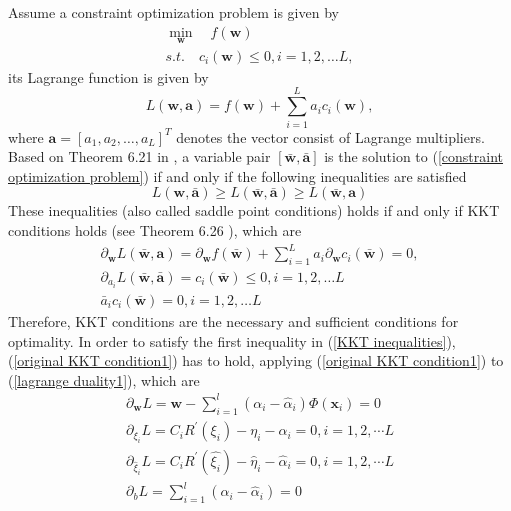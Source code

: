 Assume a constraint optimization problem is given by 
\begin{eqnarray}
\nonumber
\min_{\mathbf{w}} \quad f(\mathbf{w})\\
s.t. \quad c_{i}(\mathbf{w})\leq 0, i=1,2,\ldots L,
\label{constraint optimization problem}
\end{eqnarray}
its Lagrange function is given by 
\begin{equation}
L(\mathbf{w}, \mathbf{a})=f(\mathbf{w})+\sum_{i=1}^{L}a_{i}c_{i}(\mathbf{w}),
\label{orginal Lagrange}
\end{equation}
where $\mathbf{a}=[a_{1},a_{2},\ldots, a_{L}]^{T}$ denotes the vector consist of Lagrange multipliers.
 Based on Theorem 6.21 in \cite{scholkopf2002learning}, a variable pair $[\bar{\mathbf{w}}, \bar{\mathbf{a}}]$ is the solution to (\ref{constraint optimization problem}) if and only if the following inequalities are satisfied
 \begin{equation}
 L(\mathbf{w}, \bar{\mathbf{a}})\geq L(\bar{\mathbf{w}}, \bar{\mathbf{a}})\geq L(\bar{\mathbf{w}}, \mathbf{a})
 \label{KKT inequalities}
 \end{equation}
These inequalities (also called saddle point conditions) holds if and only if KKT conditions holds (see Theorem 6.26 \cite{scholkopf2002learning}), which are 
\begin{eqnarray}
\label{original KKT condition1}
\partial_{\mathbf{w}}L(\bar{\mathbf{w}}, \mathbf{a})=\partial_{\mathbf{w}}f(\bar{\mathbf{w}})+\sum_{i=1}^{L}a_{i}\partial_{\mathbf{w}}c_{i}(\bar{\mathbf{w}})=0,\\
\label{original KKT condition2}
\partial_{a_{i}}L(\bar{\mathbf{w}}, \bar{\mathbf{a}})=c_{i}(\bar{\mathbf{w}})\leq 0, i=1,2,\ldots L\\
\label{original KKT condition3}
\bar{a}_{i}c_{i}(\bar{\mathbf{w}})=0, i=1,2,\ldots L
\end{eqnarray}
Therefore, KKT conditions are the necessary and sufficient conditions for optimality.
In order to satisfy the first inequality in (\ref{KKT inequalities}), (\ref{original KKT condition1}) has to hold,
applying (\ref{original KKT condition1}) to (\ref{lagrange duality1}), which are  
\begin{eqnarray}
\label{partial1}
\partial_{\mathbf{w}} L=\mathbf{w}-\sum_{i=1}^{l}(\alpha_{i}-\hat{\alpha}_{i})\Phi(\mathbf{x}_{i})=0\\
\label{partial2}
\partial_{\xi_{i}}L=C_{i}R^{'}(\xi_{i})-\eta_{i}-\alpha_{i}=0, i=1,2,\cdots L\\
\label{parial3}
\partial_{\hat{\xi}_{i}}L=C_{i}R^{'}(\hat{\xi_{i}})-\hat{\eta}_{i}-\hat{\alpha}_{i}=0, i=1,2,\cdots L\\
\label{partial4}
\partial_{b}L=\sum_{i=1}^{l}(\alpha_{i}-\hat{\alpha}_{i})=0\\\nonumber
\end{eqnarray}
